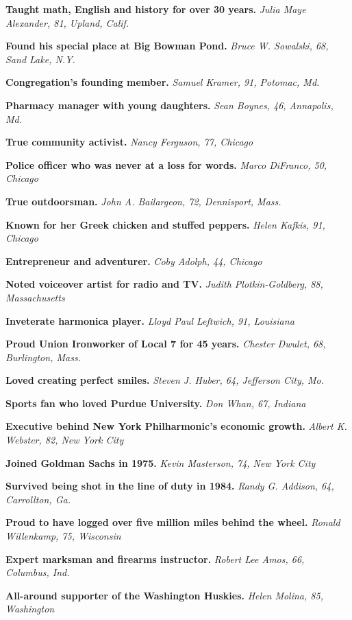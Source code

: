 \textbf{Taught math, English and history for over 30 years.} \emph{Julia
Maye Alexander, 81, Upland, Calif.}

\textbf{Found his special place at Big Bowman Pond.} \emph{Bruce W.
Sowalski, 68, Sand Lake, N.Y.}

\textbf{Congregation's founding member.} \emph{Samuel Kramer, 91,
Potomac, Md.}

\textbf{Pharmacy manager with young daughters.} \emph{Sean Boynes, 46,
Annapolis, Md.}

\textbf{True community activist.} \emph{Nancy Ferguson, 77, Chicago}

\textbf{Police officer who was never at a loss for words.} \emph{Marco
DiFranco, 50, Chicago}

\textbf{True outdoorsman.} \emph{John A. Bailargeon, 72, Dennisport,
Mass.}

\textbf{Known for her Greek chicken and stuffed peppers.} \emph{Helen
Kafkis, 91, Chicago}

\textbf{Entrepreneur and adventurer.} \emph{Coby Adolph, 44, Chicago}

\textbf{Noted voiceover artist for radio and TV.} \emph{Judith
Plotkin-Goldberg, 88, Massachusetts}

\textbf{Inveterate harmonica player.} \emph{Lloyd Paul Leftwich, 91,
Louisiana}

\textbf{Proud Union Ironworker of Local 7 for 45 years.} \emph{Chester
Dwulet, 68, Burlington, Mass.}

\textbf{Loved creating perfect smiles.} \emph{Steven J. Huber, 64,
Jefferson City, Mo.}

\textbf{Sports fan who loved Purdue University.} \emph{Don Whan, 67,
Indiana}

\textbf{Executive behind New York Philharmonic's economic growth.}
\emph{Albert K. Webster, 82, New York City}

\textbf{Joined Goldman Sachs in 1975.} \emph{Kevin Masterson, 74, New
York City}

\textbf{Survived being shot in the line of duty in 1984.} \emph{Randy G.
Addison, 64, Carrollton, Ga.}

\textbf{Proud to have logged over five million miles behind the wheel.}
\emph{Ronald Willenkamp, 75, Wisconsin}

\textbf{Expert marksman and firearms instructor.} \emph{Robert Lee Amos,
66, Columbus, Ind.}

\textbf{All-around supporter of the Washington Huskies.} \emph{Helen
Molina, 85, Washington}

